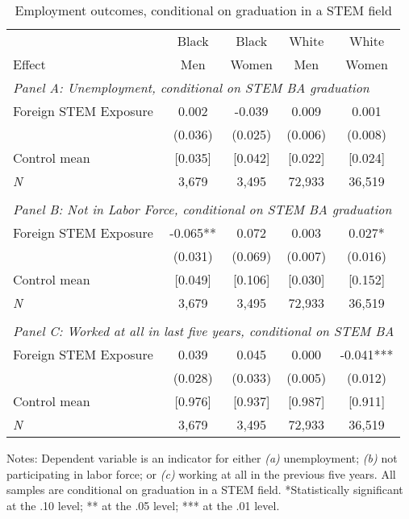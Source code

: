 \begin{table}[ht]
\caption{Employment outcomes, conditional on graduation in a STEM field}
\label{tab:TA10}
\centering
\begin{threeparttable}
\begin{tabular}{lcccc}
\toprule 
       & Black           & Black        & White        & White       \\
Effect & Men             & Women        & Men          & Women       \\
\midrule 
\multicolumn{5}{l}{\emph{Panel A: Unemployment, conditional on STEM BA graduation}}\\ 
Foreign STEM Exposure & 0.002  & -0.039  & 0.009  & 0.001  \\ 
 &  (0.036) & (0.025) & (0.006) & (0.008) \\ 
Control mean &  [0.035] & [0.042] & [0.022]  & [0.024]\\ 
\emph{N} &      3,679 &     3,495 &    72,933 &    36,519 \\ 
&&&&\\
\multicolumn{5}{l}{\emph{Panel B: Not in Labor Force, conditional on STEM BA graduation}}\\ 
Foreign STEM Exposure & -0.065** & 0.072  & 0.003  & 0.027* \\ 
 &  (0.031) & (0.069) & (0.007) & (0.016) \\ 
Control mean &  [0.049] & [0.106] & [0.030]  & [0.152]\\ 
\emph{N} &      3,679 &     3,495 &    72,933 &    36,519 \\ 
&&&&\\
\multicolumn{5}{l}{\emph{Panel C: Worked at all in last five years, conditional on STEM BA}}\\ 
Foreign STEM Exposure & 0.039  & 0.045  & 0.000  & -0.041*** \\ 
 &  (0.028) & (0.033) & (0.005) & (0.012) \\ 
Control mean &  [0.976] & [0.937] & [0.987]  & [0.911]\\ 
\emph{N} &      3,679 &     3,495 &    72,933 &    36,519 \\ 
\bottomrule 
\end{tabular} 
\footnotesize Notes: Dependent variable is an indicator for either \emph{(a)} unemployment; \emph{(b)} not participating in labor force; or \emph{(c)} working at all in the previous five years. All samples are conditional on graduation in a STEM field. *Statistically significant at the .10 level; ** at the .05 level; *** at the .01 level.
\end{threeparttable} 
\end{table} 
